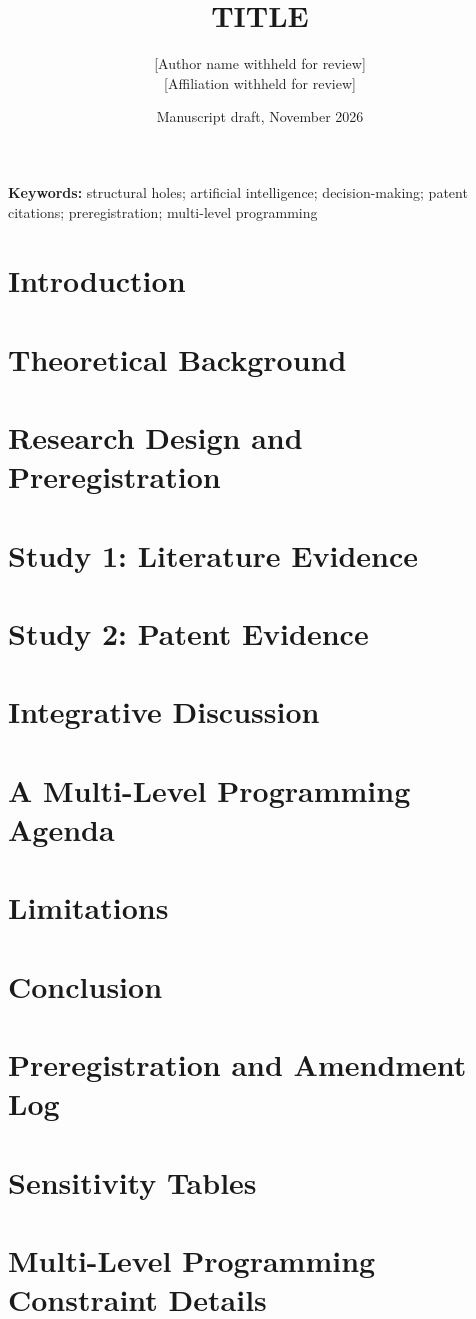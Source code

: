 \documentclass[12pt]{article}
\title{TITLE}
\author{[Author name withheld for review]\\[2pt] [Affiliation withheld for review]}
\date{Manuscript draft, November 2026}
\begin{document}
\maketitle

\begin{abstract}
\end{abstract}

\noindent\textbf{Keywords:} structural holes; artificial intelligence; decision-making; patent citations; preregistration; multi-level programming

\section{Introduction}

\section{Theoretical Background}

\section{Research Design and Preregistration}

\section{Study 1: Literature Evidence}

\section{Study 2: Patent Evidence}

\section{Integrative Discussion}

\section{A Multi-Level Programming Agenda}

\section{Limitations}

\section{Conclusion}




\appendix
\section{Preregistration and Amendment Log}
\section{Sensitivity Tables}
\section{Multi-Level Programming Constraint Details}
\end{document}
